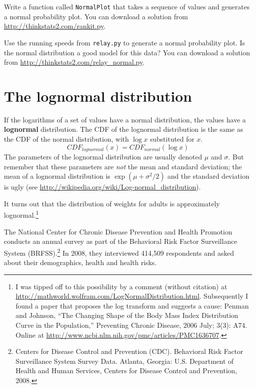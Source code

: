 \documentclass[12pt]{book}
\begin{document}
\begin{exercise}
Write a function called {\tt NormalPlot} that takes a sequence of
values and generates a normal probability plot.  You can download
a solution from \url{http://thinkstats2.com/rankit.py}.

Use the running speeds from {\tt relay.py} to generate a normal
probability plot.  Is the normal distribution a good model for this
data?  You can download a solution from
\url{http://thinkstats2.com/relay_normal.py}.

\end{exercise}


\section{The lognormal distribution}
\label{lognormal}

If the logarithms of a set of values have a normal distribution, the
values have a {\bf lognormal} distribution.  The CDF of the lognormal
distribution is the same as the CDF of the normal distribution,
with $\log x$ substituted for $x$.
%
\[ CDF_{lognormal}(x) = CDF_{normal}(\log x)\]
%
The parameters of the lognormal distribution are usually denoted
$\mu$ and $\sigma$.  But remember that these parameters are {\em not}
the mean and standard deviation; the mean of a lognormal distribution
is $\exp(\mu +\sigma^2/2)$ and the standard deviation is
ugly (see \url{http://wikipedia.org/wiki/Log-normal_distribution}).
  

It turns out that the distribution of weights for adults is
approximately lognormal.\footnote{I was tipped off to this possibility by a
  comment (without citation) at
  \url{http://mathworld.wolfram.com/LogNormalDistribution.html}.
  Subsequently I found a paper that proposes the log transform and
  suggests a cause: Penman and Johnson, ``The Changing Shape of the
  Body Mass Index Distribution Curve in the Population,'' Preventing
  Chronic Disease, 2006 July; 3(3): A74.  Online
  at \url{http://www.ncbi.nlm.nih.gov/pmc/articles/PMC1636707}.}

The National Center for Chronic Disease
Prevention and Health Promotion conducts an annual survey as part of
the Behavioral Risk Factor Surveillance System
(BRFSS).\footnote{Centers for Disease Control and Prevention
  (CDC). Behavioral Risk Factor Surveillance System Survey
  Data. Atlanta, Georgia: U.S. Department of Health and Human
  Services, Centers for Disease Control and Prevention, 2008.}  In
2008, they interviewed 414,509 respondents and asked about their
demographics, health and health risks.
\end{document}

